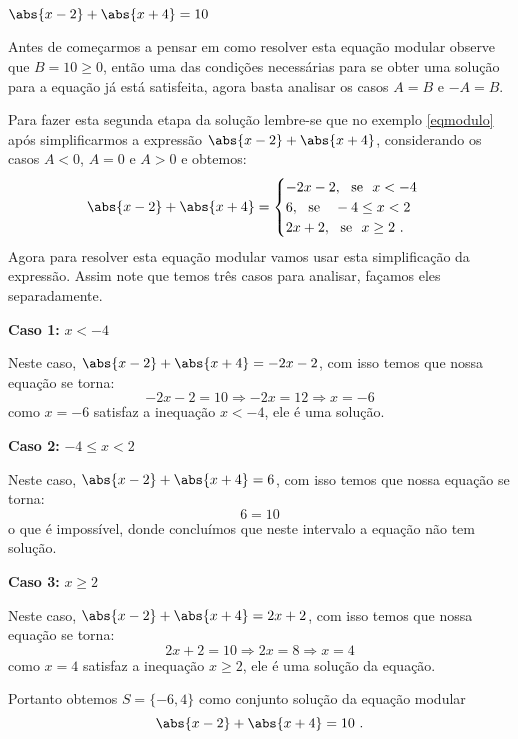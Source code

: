  \begin{exem}
    $\abs{x-2} + \abs{x+4}= 10$

   Antes de começarmos a pensar em como resolver esta equação modular observe que $B= 10 \geq 0$, então uma das condições necessárias para se obter uma solução para a equação já está satisfeita, agora basta analisar os casos $A= B$ e $-A= B$.

   Para fazer esta segunda etapa da solução lembre-se que no exemplo \autoref{eqmodulo} após simplificarmos a expressão $\abs{x-2} + \abs{x+4}$, considerando os casos $A< 0$, $A= 0$ e $A> 0$ e obtemos:
   \[ \abs{x-2} + \abs{x+4} = \begin{cases}
      -2x-2, \ \ \text{se} \ \ x < -4 \\
      6, \ \ \text{se } \ \ -4 \leq x < 2 \\
      2x + 2, \ \ \text{se} \ \ x \geq 2 \ .
     \end{cases}
  \]
 Agora para resolver esta equação modular vamos usar esta simplificação da expressão. Assim note que temos três casos para analisar, façamos eles separadamente.

 \textbf{Caso 1:} $x < -4$

 Neste caso, $\abs{x-2} + \abs{x+4}= -2x-2$, com isso temos que nossa equação se torna:
\begin{equation}
-2x-2= 10 \Rightarrow -2x= 12 \Rightarrow x= -6
\end{equation}
 como $x= -6$ satisfaz a inequação $x< -4$, ele é uma solução.

 \textbf{Caso 2:} $-4 \leq x < 2$

 Neste caso, $\abs{x-2} + \abs{x+4}= 6$, com isso temos que nossa equação se torna:
\begin{equation}
6= 10
\end{equation}
 o que é impossível, donde concluímos que neste intervalo a equação não tem solução.

 \textbf{Caso 3:} $x \geq 2 $

 Neste caso, $\abs{x-2} + \abs{x+4}= 2x + 2$, com isso temos que nossa equação se torna:
\begin{equation}
2x + 2= 10 \Rightarrow 2x= 8 \Rightarrow x= 4
\end{equation}
 como $x= 4$ satisfaz a inequação $x \geq 2$, ele é uma solução da equação.

 Portanto obtemos $S=\{-6, 4\}$ como conjunto solução da equação modular
\begin{equation}
\abs{x-2} + \abs{x+4}= 10 \ .
\end{equation}

 \end{exem}


